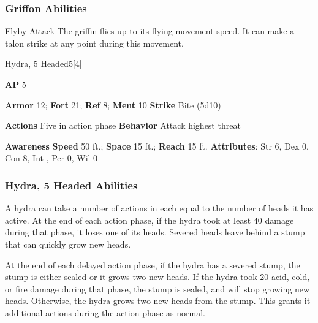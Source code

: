 \subsubsection{Griffon Abilities}

\begin{freeability}{Flyby Attack}
The griffin flies up to its flying movement speed.
It can make a talon strike at any point during this movement.
\end{freeability}

\begin{monsection}{Hydra, 5 Headed}{5}[4]
\vspace{-1em}\vspace{-1em}
\begin{spellcontent}
\begin{spelltargetinginfo}
{\textbf{AP} 5}

\pari \textbf{Armor} 12;
\textbf{Fort} 21;
\textbf{Ref} 8;
\textbf{Ment} 10
\pari \textbf{Strike} Bite  (5d10)


\pari \textbf{Actions} Five in action phase
\pari \textbf{Behavior} Attack highest threat
\end{spelltargetinginfo}
\end{spellcontent}

\begin{monsterfooter}
\pari \textbf{Awareness} 
\pari \textbf{Speed} 50 ft.;
\textbf{Space} 15 ft.;
\textbf{Reach} 15 ft.
\pari \textbf{Attributes}:
Str 6,
Dex 0,
Con 8,
Int ,
Per 0,
Wil 0
\end{monsterfooter}
\end{monsection}


\subsubsection{Hydra, 5 Headed Abilities}

A hydra can take a number of actions in each  equal to the number of heads it has active.
At the end of each action phase, if the hydra took at least 40 damage during that phase, it loses one of its heads.
Severed heads leave behind a stump that can quickly grow new heads.

At the end of each delayed action phase, if the hydra has a severed stump, the stump is either sealed or it grows two new heads.
If the hydra took 20 acid, cold, or fire damage during that phase, the stump is sealed, and will stop growing new heads.
Otherwise, the hydra grows two new heads from the stump.
This grants it additional actions during the action phase as normal.

